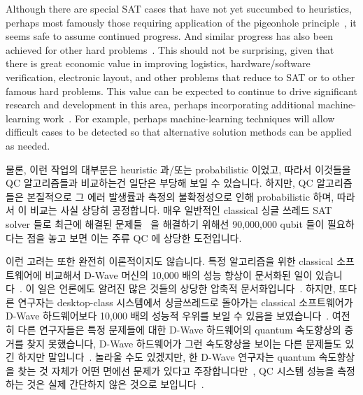 Although there are special SAT cases that have not yet succumbed to
heuristics, perhaps most famously those requiring application of the
pigeonhole principle~\cite[page~38]{Kroening:2008:DPA:1391237},
it seems safe to assume continued progress.
And similar progress has also been achieved for other hard
problems~\cite{WikipediaPrimalityTest,WikipediaTSP,WikipediaIntegerFactorization}.
This should not be surprising, given that there is great economic value
in improving logistics, hardware/software verification, electronic layout,
and other problems that reduce to SAT or to other famous hard problems.
This value can be expected to continue to drive significant research
and development in this area, perhaps incorporating additional
machine-learning work~\cite{ShaiHaim2009SAT-MachineLearning}.
For example, perhaps machine-learning techniques will allow difficult
cases to be detected so that alternative solution methods can be applied
as needed.
\fi

물론, 이런 작업의 대부분은 heuristic 과/또는 probabilistic 이었고, 따라서
이것들을 QC 알고리즘들과 비교하는건 일단은 부당해 보일 수 있습니다.
하지만, QC 알고리즘들은 본질적으로 그 에러 발생률과 측정의 불확정성으로 인해
probabilistic 하며, 따라서 이 비교는 사실 상당히 공정합니다.
매우 일반적인 classical 싱글 쓰레드 SAT solver 들로 최근에 해결된
문제들~\cite{LihaoLiang2016VerifyTreeRCU} 을 해결하기 위해선 90,000,000 qubit
들이 필요하다는 점을 놓고 보면 이는 주류 QC 에 상당한 도전입니다.

이런 고려는 또한 완전히 이론적이지도 않습니다.
특정 알고리즘을 위한 classical 소프트웨어에 비교해서 D-Wave 머신의 10,000 배의
성능 향상이 문서화된 일이 있습니다~\cite{McGeoch:2013:EEA:2482767.2482797}.
이 일은 언론에도 알려진 많은 것들의 상당한 압축적
문서화입니다~\cite{CharlesChoi2013D-WaveGoogleNASA}.
하지만, 또다른 연구자는 desktop-class 시스템에서 싱글쓰레드로 돌아가는
classical 소프트웨어가 D-Wave 하드웨어보다 10,000 배의 성능적 우위를 보일 수
있음을
보였습니다~\cite{AlexSelby2014D-Wave-vs-classical,AlexSelby2013D-WaveHarderQUBO}.
여전히 다른 연구자들은 특정 문제들에 대한 D-Wave 하드웨어의 quantum 속도향상의
증거를 찾지 못했습니다, D-Wave 하드웨어가 그런 속도향상을 보이는 다른 문제들도
있긴 하지만
말입니다~\cite{AdrianCho2014QC-D-WaveNoSpeedup,TroelsFRonnow2014QC-D-WaveNoSpeedup}.
놀라울 수도 있겠지만, 한 D-Wave 연구자는 quantum 속도향상을 찾는 것 자체가 어떤
면에선 문제가 있다고
주장합니다만~\cite{MohammadHAmin2015QC-D-Wave-QuantumSpeedupProblematic}, QC
시스템 성능을 측정하는 것은 실제 간단하지 않은 것으로
보입니다~\cite{PhysRevLett.118.100601,ArsTechnica2017QC-SpeedTradeoffs}.
\iffalse

